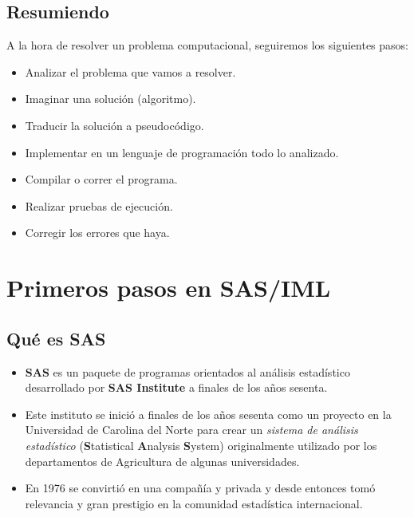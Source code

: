 \documentclass[]{book}
\providecommand{\tightlist}{%
  \setlength{\itemsep}{0pt}\setlength{\parskip}{0pt}}
\begin{document}
\hypertarget{resumiendo}{%
\section{Resumiendo}\label{resumiendo}}

A la hora de resolver un problema computacional, seguiremos los siguientes pasos:

\begin{itemize}
\tightlist
\item
  Analizar el problema que vamos a resolver.
\item
  Imaginar una solución (algoritmo).
\item
  Traducir la solución a pseudocódigo.
\item
  Implementar en un lenguaje de programación todo lo analizado.
\item
  Compilar o correr el programa.
\item
  Realizar pruebas de ejecución.
\item
  Corregir los errores que haya.
\end{itemize}

\hypertarget{primeros-pasos-en-sasiml}{%
\chapter{Primeros pasos en SAS/IML}\label{primeros-pasos-en-sasiml}}

\hypertarget{que-es-sas}{%
\section{Qué es SAS}\label{que-es-sas}}

\begin{itemize}
\tightlist
\item
  \textbf{SAS} es un paquete de programas orientados al análisis estadístico desarrollado por \textbf{SAS Institute} a finales de los años sesenta.
\item
  Este instituto se inició a finales de los años sesenta como un proyecto en la Universidad de Carolina del Norte para crear un \emph{sistema de análisis estadístico} (\textbf{S}tatistical \textbf{A}nalysis \textbf{S}ystem) originalmente utilizado por los departamentos de Agricultura de algunas universidades.
\item
  En 1976 se convirtió en una compañía y privada y desde entonces tomó relevancia y gran prestigio en la comunidad estadística internacional.
\end{itemize}
\end{document}
